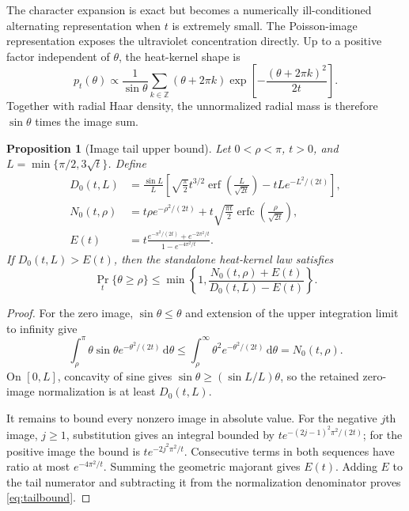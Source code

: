 \documentclass[11pt]{article}
\newtheorem{proposition}[theorem]{Proposition}
\theoremstyle{definition}
\newcommand{\dd}{\,\mathrm{d}}
\begin{document}
The character expansion is exact but becomes a numerically ill-conditioned
alternating representation when $t$ is extremely small.  The Poisson-image
representation exposes the ultraviolet concentration directly.  Up to a
positive factor independent of $\theta$, the heat-kernel shape is
\begin{equation}\label{eq:image}
 p_t(\theta)\propto
 \frac1{\sin\theta}\sum_{k\in\mathbb Z}
 (\theta+2\pi k)
 \exp\left[-\frac{(\theta+2\pi k)^2}{2t}\right].
\end{equation}
Together with radial Haar density, the unnormalized radial mass is therefore
$\sin\theta$ times the image sum.

\begin{proposition}[Image tail upper bound]\label{prop:tail}
Let $0<\rho<\pi$, $t>0$, and
$L=\min\{\pi/2,3\sqrt t\}$.  Define
\begin{align*}
 D_0(t,L)&=\frac{\sin L}{L}
 \left[\sqrt{\frac\pi2}t^{3/2}
 \operatorname{erf}\left(\frac{L}{\sqrt{2t}}\right)
 -tL e^{-L^2/(2t)}\right],\\
 N_0(t,\rho)&=t\rho e^{-\rho^2/(2t)}
 +t\sqrt{\frac{\pi t}{2}}
 \operatorname{erfc}\left(\frac{\rho}{\sqrt{2t}}\right),\\
 E(t)&=t\frac{e^{-\pi^2/(2t)}+e^{-2\pi^2/t}}
 {1-e^{-4\pi^2/t}}.
\end{align*}
If $D_0(t,L)>E(t)$, then the standalone heat-kernel law satisfies
\begin{equation}\label{eq:tailbound}
 \Pr_t\{\theta\ge\rho\}
 \le \min\left\{1,\frac{N_0(t,\rho)+E(t)}{D_0(t,L)-E(t)}\right\}.
\end{equation}
\end{proposition}

\begin{proof}
For the zero image, $\sin\theta\le\theta$ and extension of the upper
integration limit to infinity give
\[
 \int_\rho^\pi \theta\sin\theta e^{-\theta^2/(2t)}\dd\theta
 \le\int_\rho^\infty\theta^2e^{-\theta^2/(2t)}\dd\theta=N_0(t,\rho).
\]
On $[0,L]$, concavity of sine gives
$\sin\theta\ge(\sin L/L)\theta$, so the retained zero-image normalization is
at least $D_0(t,L)$.

It remains to bound every nonzero image in absolute value.  For the negative
$j$th image, $j\ge1$, substitution gives an integral bounded by
$t e^{-(2j-1)^2\pi^2/(2t)}$; for the positive image the bound is
$t e^{-2j^2\pi^2/t}$.  Consecutive terms in both sequences have ratio at most
$e^{-4\pi^2/t}$.  Summing the geometric majorant gives $E(t)$.  Adding $E$ to
the tail numerator and subtracting it from the normalization denominator
proves \eqref{eq:tailbound}.
\end{proof}
\end{document}

